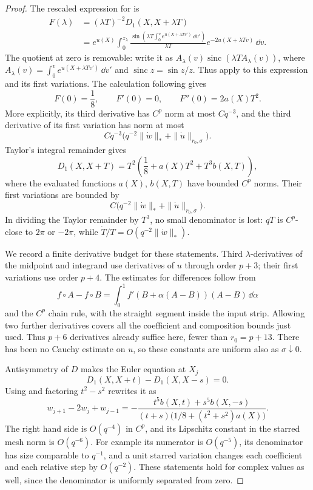 \begin{proof}
The rescaled expression for  is
\[
\begin{split}
F(\lambda)
&=(\lambda T)^{-2}D_1(X,X+\lambda T)\\
&=e^{u(X)}\int_0^{z_\lambda}
\frac{\sin\left(\lambda T\int_0^v
                 e^{u(X+\lambda Tv')}\,\dd v'\right)}{\lambda T}
 e^{-2u(X+\lambda Tv)}\,\dd v .
\end{split}
\]
The quotient at zero is removable: write it as
\(A_\lambda(v)\operatorname{sinc}(\lambda T A_\lambda(v))\), where
\(A_\lambda(v)=\int_0^v e^{u(X+\lambda Tv')}\,\dd v'\) and
\(\operatorname{sinc}z=\sin z/z\).
Thus  apply to this
expression and its first variations.  The calculation following
 gives
\[
F(0)=\frac18,\qquad F'(0)=0,\qquad F''(0)=2a(X)T^2.
\]
More explicitly, its third derivative has \(C^p\) norm at most
\(Cq^{-3}\), and the third derivative of its first variation has
norm at most
\[
Cq^{-3}\bigl(q^{-2}\|\dot w\|_*+\|\dot u\|_{r_0,\sigma}\bigr).
\]
Taylor's integral remainder gives
\begin{equation}\label{ana:D1-uniform-expansion}
D_1(X,X+T)
=T^2\left(\frac18+a(X)T^2+T^3b(X,T)\right),
\end{equation}
where the evaluated functions \(a(X)\), \(b(X,T)\) have bounded
\(C^p\) norms.  Their first variations are bounded by
\[
C\bigl(q^{-2}\|\dot w\|_*+\|\dot u\|_{r_0,\sigma}\bigr).
\]
In dividing the Taylor remainder by \(T^3\), no small denominator
is lost: \(qT\) is \(C^p\)-close to \(2\pi\) or \(-2\pi\), while
\(\dot T/T=O(q^{-2}\|\dot w\|_*)\).

We record a finite derivative budget for these statements.  Third
\(\lambda\)-derivatives of the midpoint and integrand use derivatives
of \(u\) through order \(p+3\); their first variations use order \(p+4\).
The estimates for differences follow from
\[
f\circ A-f\circ B
=\int_0^1 f'(B+\alpha(A-B))(A-B)\,\dd\alpha
\]
and the \(C^p\) chain rule, with the straight segment inside the
input strip.  Allowing two further derivatives covers all the
coefficient and composition bounds just used.  Thus \(p+6\)
derivatives already suffice here, fewer than \(r_0=p+13\).
There has been no Cauchy estimate on \(u\), so these constants are
uniform also as \(\sigma\downarrow0\).

Antisymmetry of \(D\) makes the Euler equation at \(X_j\)
\[
D_1(X,X+t)-D_1(X,X-s)=0.
\]
Using  and factoring \(t^2-s^2\)
rewrites it as
\begin{equation}\label{ana:mesh-fixed-point}
w_{j+1}-2w_j+w_{j-1}
=-\frac{t^5b(X,t)+s^5b(X,-s)}
 {(t+s)\bigl(1/8+(t^2+s^2)a(X)\bigr)}.
\end{equation}
The right hand side is \(O(q^{-4})\) in \(C^p\), and its Lipschitz
constant in the starred mesh norm is \(O(q^{-6})\).
For example its numerator is \(O(q^{-5})\), its denominator has
size comparable to \(q^{-1}\), and a unit starred variation changes
each coefficient and each relative step by \(O(q^{-2})\).
These statements hold for complex values as well, since the
denominator is uniformly separated from zero.


\end{proof}
